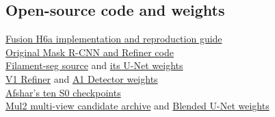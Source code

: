 \documentclass[sigconf]{acmart}
\begin{document}
{\footnotesize


}

\subsection*{Open-source code and weights}
\noindent
\href{https://github.com/wangzgui/solar-filament-segmentation-2026}{Fusion H6a implementation and reproduction guide}\\
\href{https://www.kaggle.com/code/nomannic19/cv-solar-filament-mask-r-cnn-u-net-refiner}{Original Mask R-CNN and Refiner code}\\
\href{https://github.com/ameyypawar/filament-seg}{Filament-seg source} and
\href{https://www.kaggle.com/datasets/ameypawar123456789/filament-seg-weights}{its U-Net weights}\\
\href{https://www.kaggle.com/datasets/zhuowamg/v1output/versions/1}{V1 Refiner} and
\href{https://www.kaggle.com/datasets/zhuowamg/a1data/versions/1}{A1 Detector weights}\\
\href{https://www.kaggle.com/datasets/dariushafshar/solar-filament-unet-weights/versions/2}{Afshar's ten S0 checkpoints}\\
\href{https://www.kaggle.com/datasets/zhuowamg/mul2out/versions/1}{Mul2 multi-view candidate archive} and
\href{https://www.kaggle.com/datasets/zhuowamg/v3output}{Blended U-Net weights}
\end{document}
